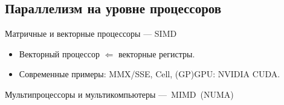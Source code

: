 \subsection {Параллелизм на уровне процессоров}

\begin{frame}{Матричные и векторные процессоры — SIMD}

\pause
\begin{itemize}
    \item Векторный процессор $\Longleftarrow$ векторные регистры.
    \item \pause Современные примеры: \pause MMX/SSE, \pause Cell, \pause (GP)GPU: NVIDIA CUDA.
\end{itemize}


\end{frame}


\begin{frame}{Мультипроцессоры и мультикомпьютеры —~\small{MIMD~(NUMA)}}
\end{frame}


